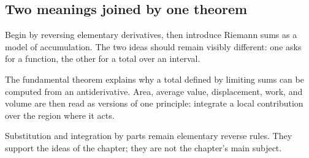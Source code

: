 \subsection{Two meanings joined by one theorem}

\begin{corebox}
Begin by reversing elementary derivatives, then introduce Riemann sums as a model of accumulation. The two ideas should remain visibly different: one asks for a function, the other for a total over an interval.
\end{corebox}

\begin{corebox}
The fundamental theorem explains why a total defined by limiting sums can be computed from an antiderivative. Area, average value, displacement, work, and volume are then read as versions of one principle: integrate a local contribution over the region where it acts.
\end{corebox}

Substitution and integration by parts remain elementary reverse rules. They support the ideas of the chapter; they are not the chapter's main subject.
